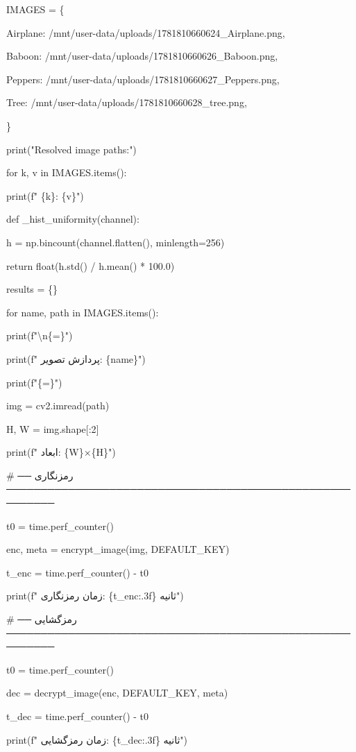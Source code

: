 IMAGES = \{

\textquotesingle Airplane\textquotesingle: \textquotesingle/mnt/user-data/uploads/1781810660624\_Airplane.png\textquotesingle,

\textquotesingle Baboon\textquotesingle: \textquotesingle/mnt/user-data/uploads/1781810660626\_Baboon.png\textquotesingle,

\textquotesingle Peppers\textquotesingle: \textquotesingle/mnt/user-data/uploads/1781810660627\_Peppers.png\textquotesingle,

\textquotesingle Tree\textquotesingle: \textquotesingle/mnt/user-data/uploads/1781810660628\_tree.png\textquotesingle,

\}

print("Resolved image paths:")

for k, v in IMAGES.items():

print(f" \{k\}: \{v\}")

def \_hist\_uniformity(channel):

h = np.bincount(channel.flatten(), minlength=256)

return float(h.std() / h.mean() * 100.0)

results = \{\}

for name, path in IMAGES.items():

print(f"\textbackslash n\{\textquotesingle=\}")

print(f" پردازش تصویر: \{name\}")

print(f"\{\textquotesingle=\}")

img = cv2.imread(path)

H, W = img.shape{[}:2{]}

print(f" ابعاد: \{W\}×\{H\}")

\# ── رمزنگاری ─────────────────────────────────────────────────────────

t0 = time.perf\_counter()

enc, meta = encrypt\_image(img, DEFAULT\_KEY)

t\_enc = time.perf\_counter() - t0

print(f" زمان رمزنگاری: \{t\_enc:.3f\} ثانیه")

\# ── رمزگشایی ─────────────────────────────────────────────────────────

t0 = time.perf\_counter()

dec = decrypt\_image(enc, DEFAULT\_KEY, meta)

t\_dec = time.perf\_counter() - t0

print(f" زمان رمزگشایی: \{t\_dec:.3f\} ثانیه")

